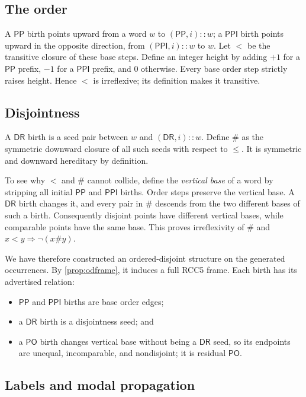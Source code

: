 \documentclass[11pt]{article}
\theoremstyle{plain}
\theoremstyle{definition}
\theoremstyle{remark}
\newcommand{\PP}{\ensuremath{\mathsf{PP}}}
\newcommand{\PPI}{\ensuremath{\mathsf{PPI}}}
\newcommand{\PO}{\ensuremath{\mathsf{PO}}}
\newcommand{\DR}{\ensuremath{\mathsf{DR}}}
\begin{document}
\subsection{The order}

A $\PP$ birth points upward from a word $w$ to $(\PP,i)::w$; a $\PPI$ birth
points upward in the opposite direction, from $(\PPI,i)::w$ to $w$.  Let $<$
be the transitive closure of these base steps.  Define an integer height by
adding $+1$ for a $\PP$ prefix, $-1$ for a $\PPI$ prefix, and $0$ otherwise.
Every base order step strictly raises height.  Hence $<$ is irreflexive; its
definition makes it transitive.

\subsection{Disjointness}

A $\DR$ birth is a seed pair between $w$ and $(\DR,i)::w$.  Define $\#$ as
the symmetric downward closure of all such seeds with respect to $\leq$.
It is symmetric and downward hereditary by definition.

To see why $<$ and $\#$ cannot collide, define the \emph{vertical base} of a
word by stripping all initial $\PP$ and $\PPI$ births.  Order steps preserve
the vertical base.  A $\DR$ birth changes it, and every pair in $\#$ descends
from the two different bases of such a birth.  Consequently disjoint points
have different vertical bases, while comparable points have the same base.
This proves irreflexivity of $\#$ and $x<y\Rightarrow\neg(x\#y)$.

We have therefore constructed an ordered-disjoint structure on the generated
occurrences.  By \cref{prop:odframe}, it induces a full RCC5 frame.  Each birth
has its advertised relation:
\begin{itemize}
  \item $\PP$ and $\PPI$ births are base order edges;
  \item a $\DR$ birth is a disjointness seed; and
  \item a $\PO$ birth changes vertical base without being a $\DR$ seed, so its
  endpoints are unequal, incomparable, and nondisjoint; it is residual $\PO$.
\end{itemize}

\subsection{Labels and modal propagation}
\end{document}
